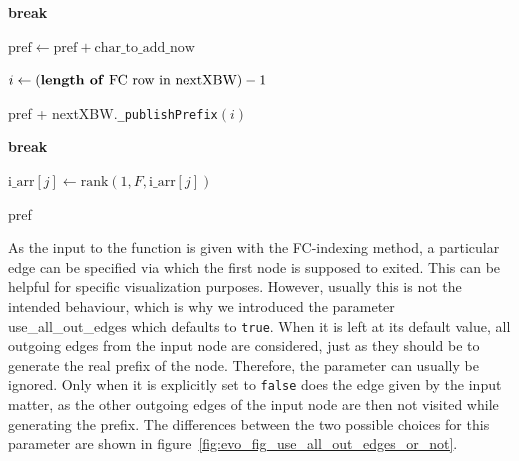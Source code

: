 \documentclass[a4paper,12pt,twoside,BCOR=10mm]{scrbook}
\begin{document}
\begin{algorithm}
\begin{algorithmic}[1]
		\State \textbf{break}

	\Else

		\State $ \textrm{pref} \gets \textrm{pref} + \textrm{char\_to\_add\_now} $


			\State $ i \gets (\textrm{\textbf{length of} FC row in nextXBW}) - 1 $

			\State \Return pref + nextXBW.\texttt{\_publishPrefix}$( i )$
		\EndIf
	\EndIf

		\State \textbf{break}
	\EndIf

		\State $ \textrm{i\_arr}[ j ] \gets \textrm{rank}(1, F, \textrm{i\_arr}[ j ]) $
	\EndFor
\EndFor

\State \Return pref

\end{algorithmic}
\end{algorithm}
As the input to the function is given with the FC-indexing method, a particular edge can be specified 
via which the first node is supposed to exited. This can be helpful for specific visualization purposes. 
However, usually this is not the intended behaviour, which is why we introduced the parameter 
use\_all\_out\_edges which defaults to \texttt{true}. 
When it is left at its default value, all outgoing edges from the input node are considered, 
just as they should be to generate the real prefix of the node. Therefore, the parameter can usually be ignored. 
Only when it is explicitly set to \texttt{false} does the edge given by the input matter, 
as the other outgoing edges of the input node are then not visited while generating the prefix. 
The differences between the two possible choices for this parameter 
are shown in figure~\ref{fig:evo_fig_use_all_out_edges_or_not}. \\
\end{document}
